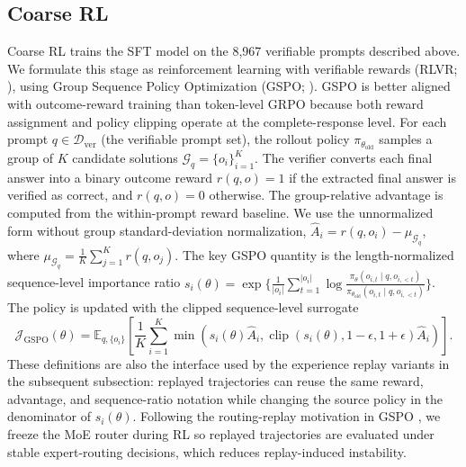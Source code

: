 \subsection{Coarse RL}
\label{sec:coarse-rl}

Coarse RL trains the SFT model on the 8,967 verifiable prompts described above.
We formulate this stage as reinforcement learning with verifiable rewards
(RLVR; \citealt{lambert2024tulu,r1}), using Group Sequence Policy Optimization
(GSPO; \citealt{zheng2025gspo}). GSPO is better aligned with outcome-reward
training than token-level GRPO because both reward assignment and policy
clipping operate at the complete-response level. For each prompt
$q \in \mathcal{D}_{\mathrm{ver}}$ (the verifiable prompt set), the rollout policy
$\pi_{\theta_{\mathrm{old}}}$ samples a group of $K$ candidate solutions
$\mathcal{G}_q=\{o_i\}_{i=1}^K$. The verifier converts each final answer into a
binary outcome reward $r(q,o)=1$ if the extracted final answer is verified as
correct, and $r(q,o)=0$ otherwise.
The group-relative advantage is computed from the within-prompt reward baseline.
We use the unnormalized form without group standard-deviation normalization,
$\widehat{A}_i=r(q,o_i)-\mu_{\mathcal{G}_q}$, where
$\mu_{\mathcal{G}_q}=\frac{1}{K}\sum_{j=1}^{K}r(q,o_j)$.
The key GSPO quantity is the length-normalized sequence-level importance ratio
$s_i(\theta)=\exp\{\frac{1}{|o_i|}\sum_{t=1}^{|o_i|}\log
\frac{\pi_{\theta}(o_{i,t}\mid q,o_{i,<t})}
{\pi_{\theta_{\mathrm{old}}}(o_{i,t}\mid q,o_{i,<t})}\}$. The policy is
updated with the clipped sequence-level surrogate
\begin{equation}
\mathcal{J}_{\mathrm{GSPO}}(\theta)=
\mathbb{E}_{q,\{o_i\}}
\left[
\frac{1}{K}\sum_{i=1}^{K}
\min\left(
s_i(\theta)\widehat{A}_i,
\operatorname{clip}(s_i(\theta),1-\epsilon,1+\epsilon)\widehat{A}_i
\right)
\right].
\label{eq:coarse-gspo-objective}
\end{equation}
These definitions are also the interface used by the experience replay variants in the subsequent subsection: 
replayed trajectories can reuse the same reward, advantage, and sequence-ratio
notation while changing the source policy in the denominator of $s_i(\theta)$.
Following the routing-replay motivation in GSPO \citep{zheng2025gspo}, we freeze
the MoE router during RL so replayed trajectories are evaluated under stable
expert-routing decisions, which reduces replay-induced instability.

